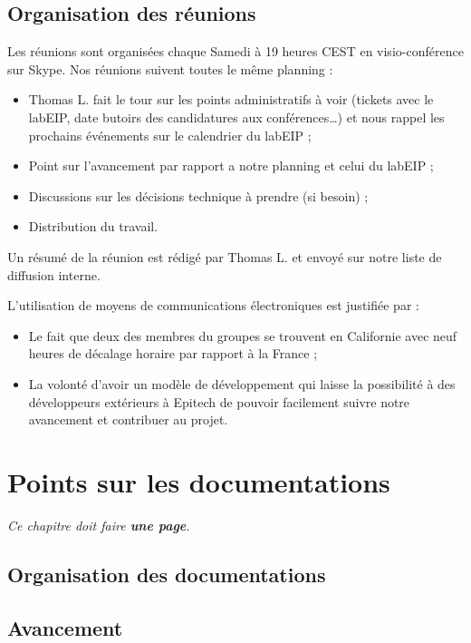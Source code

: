 \documentclass[francais]{rtxreport}
\begin{document}
\section{Organisation des réunions}

Les réunions sont organisées chaque Samedi à 19 heures CEST en visio-conférence
sur Skype. Nos réunions suivent toutes le même planning :
\begin{itemize}
\item Thomas L. fait le tour sur les points administratifs à voir (tickets avec
le labEIP, date butoirs des candidatures aux conférences\ldots) et nous
rappel les prochains événements sur le calendrier du labEIP ;
\item Point sur l'avancement par rapport a notre planning et celui du labEIP ;
\item Discussions sur les décisions technique à prendre (si besoin) ;
\item Distribution du travail.
\end{itemize}

Un résumé de la réunion est rédigé par Thomas L. et envoyé sur notre liste de
diffusion interne.

L'utilisation de moyens de communications électroniques est justifiée par :
\begin{itemize}
\item Le fait que deux des membres du groupes se trouvent en Californie avec
neuf heures de décalage horaire par rapport à la France ;
\item La volonté d'avoir un modèle de développement qui laisse la possibilité à
des développeurs extérieurs à Epitech de pouvoir facilement suivre notre
avancement et contribuer au projet.
\end{itemize}

\chapter{Points sur les documentations}

\emph{Ce chapitre doit faire \textbf{une page}.}

\section{Organisation des documentations}

\section{Avancement}
\end{document}
